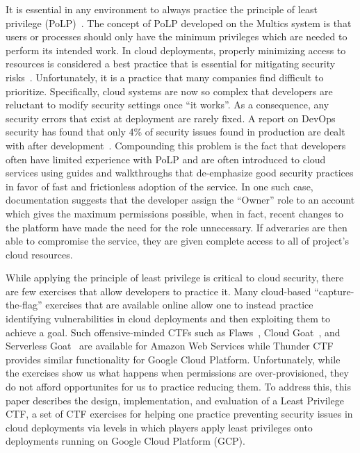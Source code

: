 It is essential in any environment to always practice the principle of least privilege (PoLP)~\cite{Saltzer1974}. The concept of PoLP developed on the Multics system is that users or processes should only have the minimum privileges which are needed to perform its intended 
work.  In cloud deployments, properly minimizing access to resources is considered
a best practice that is essential for mitigating security risks~\cite{Sanders2018}. 
Unfortunately, it is a practice that many companies find difficult to prioritize.
Specifically, cloud systems are now so complex that developers are reluctant to modify security
settings once ``it works''. As a consequence, any security errors that exist at deployment are
rarely fixed.  A report on DevOps security has found that only 4\% of security issues found in 
production are dealt with after development~\cite{Foremski}. Compounding this problem is the
fact that developers often have limited experience with PoLP and are often introduced to cloud 
services using guides and walkthroughs that de-emphasize good security practices in favor of 
fast and  frictionless adoption of the service.  In one such case, documentation suggests that 
the developer assign the ``Owner'' role to an account which gives the maximum permissions
possible, when in fact, recent changes to the platform have made the need for the role
unnecessary\cite{GoogleVis}.  If adveraries are then able to compromise the service,
they are given complete access to all of project's cloud resources.


While applying the principle of least privilege is critical to cloud security, there are
few exercises that allow developers to practice it.  Many cloud-based ``capture-the-flag''
exercises that are available online allow one to instead practice identifying
vulnerabilities in cloud deployments and then exploiting them to achieve a goal. 
Such offensive-minded CTFs such as Flaws~\cite{flaws,flaws2}, Cloud Goat~\cite{cloudgoat},
and Serverless Goat~\cite{serverlessgoat} are available for Amazon Web Services while Thunder CTF~\cite{thunder-ctf} provides similar functionality for Google Cloud Platform.
Unfortunately, while the exercises show us what happens when permissions are over-provisioned,
they do not afford opportunites for us to practice reducing them. To address this, this
paper describes the design, implementation, and evaluation of a Least Privilege CTF, a set of CTF exercises for helping one practice preventing security issues in cloud deployments
via levels in which players apply least privileges onto deployments running on Google Cloud 
Platform (GCP).
 
